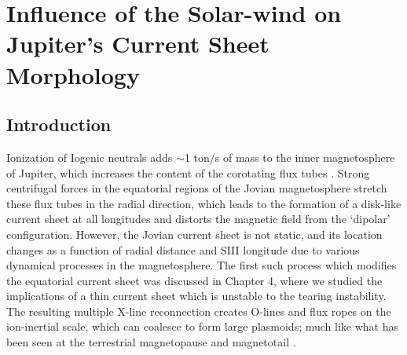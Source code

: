 \chapter{Influence of the Solar-wind on Jupiter's Current Sheet Morphology}

\section{Introduction}

Ionization of Iogenic neutrals adds  $\sim$1 ton/s of mass to the inner magnetosphere of Jupiter, which increases the content of the corotating flux tubes \cite{Bagenal2011b}. Strong centrifugal forces in the equatorial regions of the Jovian magnetosphere stretch these flux tubes in the radial direction, which leads to the formation of a disk-like current sheet at all longitudes \cite{Khurana2004a} and distorts the magnetic field from the `dipolar' configuration. However, the Jovian current sheet is not static, and its location changes as a function of radial distance and SIII longitude due to various dynamical processes in the magnetosphere. The first such process which modifies the equatorial current sheet was discussed in Chapter 4, where we studied the implications of a thin current sheet which is unstable to the tearing instability. The resulting multiple X-line reconnection creates O-lines and flux ropes on the ion-inertial scale, which can coalesce to form large plasmoids; much like what has been seen at the terrestrial magnetopause and magnetotail \cite{AkhavanTafti2020ComparativeEvents, Eastwood2005ObservationsStudy}.

